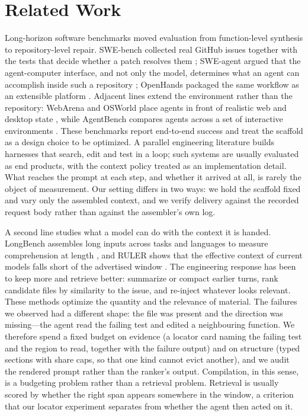 \section{Related Work}

Long-horizon software benchmarks moved evaluation from function-level synthesis to repository-level repair.
SWE-bench collected real GitHub issues together with the tests that decide whether a patch resolves them \citep{jimenez2024swebench}; SWE-agent argued that the agent-computer interface, and not only the model, determines what an agent can accomplish inside such a repository \citep{yang2024sweagent}; OpenHands packaged the same workflow as an extensible platform \citep{wang2024openhands}.
Adjacent lines extend the environment rather than the repository: WebArena and OSWorld place agents in front of realistic web and desktop state \citep{zhou2023webarena,xie2024osworld}, while AgentBench compares agents across a set of interactive environments \citep{liu2023agentbench}.
These benchmarks report end-to-end success and treat the scaffold as a design choice to be optimized.
A parallel engineering literature builds harnesses that search, edit and test in a loop; such systems are usually evaluated as end products, with the context policy treated as an implementation detail.
What reaches the prompt at each step, and whether it arrived at all, is rarely the object of measurement.
Our setting differs in two ways: we hold the scaffold fixed and vary only the assembled context, and we verify delivery against the recorded request body rather than against the assembler's own log.

A second line studies what a model can do with the context it is handed.
LongBench assembles long inputs across tasks and languages to measure comprehension at length \citep{bai2023longbench}, and RULER shows that the effective context of current models falls short of the advertised window \citep{hsieh2024ruler}.
The engineering response has been to keep more and retrieve better: summarize or compact earlier turns, rank candidate files by similarity to the issue, and re-inject whatever looks relevant.
These methods optimize the quantity and the relevance of material.
The failures we observed had a different shape: the file was present and the direction was missing---the agent read the failing test and edited a neighbouring function.
We therefore spend a fixed budget on evidence (a locator card naming the failing test and the region to read, together with the failure output) and on structure (typed sections with share caps, so that one kind cannot evict another), and we audit the rendered prompt rather than the ranker's output.
Compilation, in this sense, is a budgeting problem rather than a retrieval problem.
Retrieval is usually scored by whether the right span appears somewhere in the window, a criterion that our locator experiment separates from whether the agent then acted on it.

